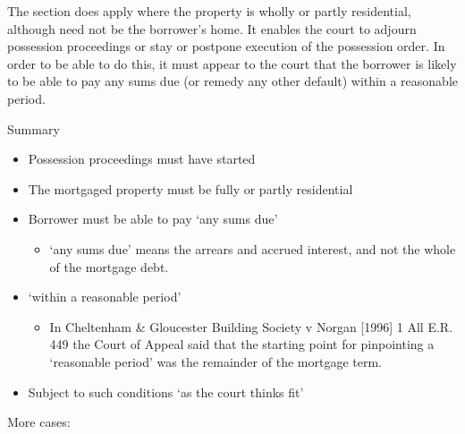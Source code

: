 \documentclass[
]{article}
\providecommand{\tightlist}{%
  \setlength{\itemsep}{0pt}\setlength{\parskip}{0pt}}
\newenvironment{env-d6ce83a0-f7a8-46b6-be95-b1235f1feb63}
{
    \savenotes\tcolorbox[blanker,breakable,left=5pt,borderline west={2pt}{-4pt}{gray}]
}
{
    \endtcolorbox\spewnotes
}
\begin{document}
The section does apply where the property is wholly or partly
residential, although need not be the borrower's home. It enables the
court to adjourn possession proceedings or stay or postpone execution of
the possession order. In order to be able to do this, it must appear to
the court that the borrower is likely to be able to pay any sums due (or
remedy any other default) within a reasonable period.

\begin{env-d6ce83a0-f7a8-46b6-be95-b1235f1feb63}

Summary

\begin{itemize}
\tightlist
\item
  Possession proceedings must have started
\item
  The mortgaged property must be fully or partly residential
\item
  Borrower must be able to pay `any sums due'

  \begin{itemize}
  \tightlist
  \item
    `any sums due' means the arrears and accrued interest, and not the
    whole of the mortgage debt.
  \end{itemize}
\item
  `within a reasonable period'

  \begin{itemize}
  \tightlist
  \item
    In Cheltenham \& Gloucester Building Society v Norgan {[}1996{]} 1
    All E.R. 449 the Court of Appeal said that the starting point for
    pinpointing a `reasonable period' was the remainder of the mortgage
    term.
  \end{itemize}
\item
  Subject to such conditions `as the court thinks fit'
\end{itemize}

\end{env-d6ce83a0-f7a8-46b6-be95-b1235f1feb63}

More cases:
\end{document}
